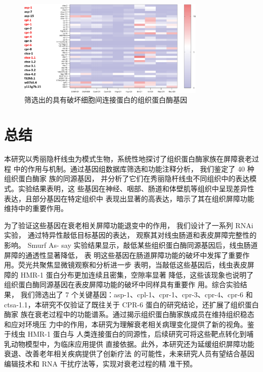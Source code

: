 \begin{figure}[H]
    \centering
    \includegraphics[width=0.8\textwidth]{img/heatmap2.png}
    \caption{筛选出的具有破坏细胞间连接蛋白的组织蛋白酶基因}
    \label{fig:heatmap2}
\end{figure}

\section{总结}

本研究以秀丽隐杆线虫为模式生物，系统性地探讨了组织蛋白酶家族在屏障衰老过程 中的作用与机制。通过基因组数据库筛选和功能注释分析， 我们鉴定了 40 种组织蛋白酶家 族的同源基因， 并分析了它们在秀丽隐杆线虫不同组织中的表达模式。实验结果表明，这 些基因在神经、咽部、肠道和体壁肌等组织中呈现差异性表达，且部分基因在特定组织中 表现出显著的高表达，暗示了其在组织屏障功能维持中的重要作用。

为了验证这些基因在衰老相关屏障功能退变中的作用， 我们设计了一系列 RNAi 实验， 通过特异性敲低目标基因的表达， 观察其对线虫肠道和表皮屏障完整性的影响。 Smurf As-    say 实验结果显示，敲低某些组织蛋白酶同源基因后，线虫肠道屏障的通透性显著降低， 表  明这些基因在肠道屏障功能的破坏中发挥了重要作用。荧光共聚焦显微镜观察和分析进一步 表明，当敲低这些基因后，线虫表皮屏障的 HMR-1 蛋白分布更加连续且密集，空隙率显著 降低，这些该现象也说明了组织蛋白酶同源基因在表皮屏障功能的破坏中同样具有重要作  用。综合实验结果， 我们筛选出了 7 个关键基因：asp-1、cpl-1、cpr-1、cpr-3、cpr-4、cpr-6    和 ctsa-1.1，本研究不仅验证了既往关于 CPR-6 蛋白的研究结论，还扩展了组织蛋白酶家  族在衰老过程中的功能谱系。通过揭示组织蛋白酶家族成员在维持组织稳态和应对环境压  力中的作用，本研究为理解衰老相关病理变化提供了新的视角。鉴于线虫 HMR-1 蛋白与  人类连接蛋白的同源性，后续研究可将这些靶点转化到哺乳动物模型中，为临床应用提供  直接依据。此外，本研究还为延缓组织屏障功能衰退、改善老年相关疾病提供了创新疗法  的可能性，未来研究人员有望结合基因编辑技术和 RNA 干扰疗法等，实现对衰老过程的精  准干预。
